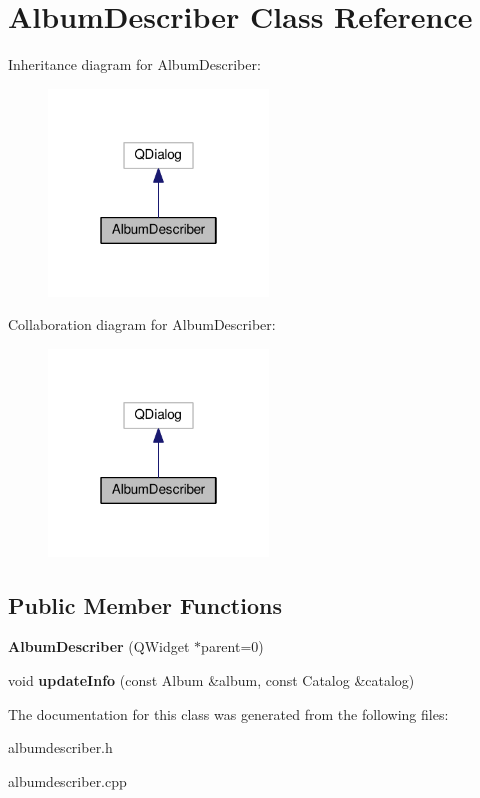 \hypertarget{class_album_describer}{}\section{Album\+Describer Class Reference}
\label{class_album_describer}


Inheritance diagram for Album\+Describer\+:
\nopagebreak
\begin{figure}[H]
\begin{center}
\leavevmode
\includegraphics[width=166pt]{class_album_describer__inherit__graph}
\end{center}
\end{figure}


Collaboration diagram for Album\+Describer\+:
\nopagebreak
\begin{figure}[H]
\begin{center}
\leavevmode
\includegraphics[width=166pt]{class_album_describer__coll__graph}
\end{center}
\end{figure}
\subsection*{Public Member Functions}
\begin{DoxyCompactItemize}
\item 
{\bfseries Album\+Describer} (Q\+Widget $\ast$parent=0)\hypertarget{class_album_describer_ad008c80d667df6a886a326b213d7a97f}{}\label{class_album_describer_ad008c80d667df6a886a326b213d7a97f}

\item 
void {\bfseries update\+Info} (const Album \&album, const Catalog \&catalog)\hypertarget{class_album_describer_af7621a37d31dd0844cb9134ae319c95a}{}\label{class_album_describer_af7621a37d31dd0844cb9134ae319c95a}

\end{DoxyCompactItemize}


The documentation for this class was generated from the following files\+:\begin{DoxyCompactItemize}
\item 
albumdescriber.\+h\item 
albumdescriber.\+cpp\end{DoxyCompactItemize}
